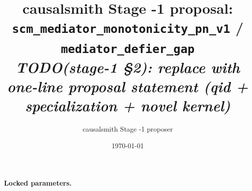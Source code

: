 \documentclass[11pt]{article}
\title{causalsmith Stage -1 proposal: \texttt{scm\_mediator\_monotonicity\_pn\_v1} / \texttt{mediator\_defier\_gap}%
  \\ \large\textit{TODO(stage-1 \S2): replace with one-line proposal statement (qid + specialization + novel kernel)}}
\author{causalsmith Stage -1 proposer}
\date{\today}
\theoremstyle{definition}
\theoremstyle{plain}
\theoremstyle{remark}
\begin{document}
\maketitle


\paragraph{Locked parameters.}

\begin{abstract}
\end{abstract}
\end{document}
